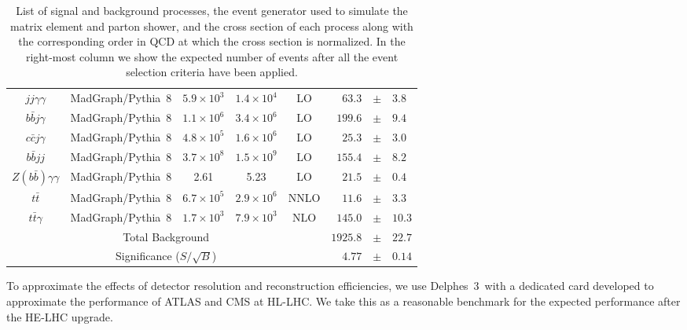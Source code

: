 \begin{table}
\begin{tabular}{|c|c|cc|c|rcl|}
$jj\gamma\gamma$              			& {\sc\small MadGraph}/{\sc\small Pythia~8} 	& $5.9\times 10^{3}$     & $1.4\times 10^{4}$     & LO 					& $63.3$ 		& $\pm$ & $3.8$ \\
$b\bar{b}j\gamma$             			& {\sc\small MadGraph}/{\sc\small Pythia~8} 	& $1.1\times 10^{6}$     & $3.4\times 10^{6}$     & LO 					& $199.6$ 	& $\pm$ & $9.4$ \\
$c\bar{c}j\gamma$             			& {\sc\small MadGraph}/{\sc\small Pythia~8} 	& $4.8\times 10^{5}$     	& $1.6\times 10^{6}$     & LO 				& $25.3$ 		& $\pm$ & $3.0$ \\
$b\bar{b}jj$                  					& {\sc\small MadGraph}/{\sc\small Pythia~8} 	& $3.7\times 10^{8}$     	& $1.5\times 10^{9}$     & LO 				& $155.4$ 	& $\pm$ & $8.2$ \\
$Z(b\bar{b})\gamma\gamma$   		& {\sc\small MadGraph}/{\sc\small Pythia~8} 	& 2.61     			& 5.23      			& LO 											& $21.5$ 		& $\pm$ & $0.4$ \\ \hline
$t\bar{t}$                    					& {\sc\small MadGraph}/{\sc\small Pythia~8} 	& $6.7\times 10^{5}$     	& $2.9\times 10^{6}$     	& NNLO 		& $11.6$ 		& $\pm$ & $3.3$ \\
$t\bar{t}\gamma$              				& {\sc\small MadGraph}/{\sc\small Pythia~8} 	& $1.7\times 10^{3}$     	& $7.9\times 10^{3}$     & NLO 				& $145.0$ 	& $\pm$ & $10.3$ \\ \hline
\multicolumn{5}{|c|}{Total Background}					& $1925.8$ & $\pm$ & $22.7$ \\ \hline
\multicolumn{5}{|c|}{Significance ($S/\sqrt{B}$)}		& $4.77$ & $\pm$ & $0.14$ \\ \hline
\end{tabular}
\caption{List of signal and background processes, the event generator used to simulate the matrix element and parton shower, and the cross section of each process along with the corresponding order in QCD at which the cross section is normalized. In the right-most column we show the expected number of events after all the event selection criteria have been applied.}
\label{t.backgrounds}
\end{table}
\endgroup


To approximate the effects of detector resolution and reconstruction efficiencies, we use {\sc\small Delphes~3}\ with a dedicated card developed to approximate the performance of ATLAS and CMS at HL-LHC. We take this as a reasonable benchmark for the expected performance after the HE-LHC upgrade.

